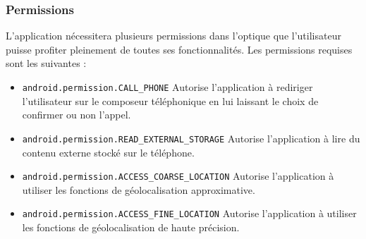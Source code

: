 \subsubsection{Permissions}

	L'application nécessitera plusieurs permissions dans l'optique que l'utilisateur puisse profiter pleinement de toutes ses fonctionnalités. Les permissions requises sont les suivantes : 
	\begin{itemize}
		\item \texttt{android.permission.CALL\_PHONE} Autorise l'application à rediriger l'utilisateur sur le composeur téléphonique en lui laissant le choix de confirmer ou non l'appel.
		\item \texttt{android.permission.READ\_EXTERNAL\_STORAGE} Autorise l'application à lire du contenu externe stocké sur le téléphone.
		\item \texttt{android.permission.ACCESS\_COARSE\_LOCATION} Autorise l'application à utiliser les fonctions de géolocalisation approximative.
		\item \texttt{android.permission.ACCESS\_FINE\_LOCATION} Autorise l'application à utiliser les fonctions de géolocalisation de haute précision.
	\end{itemize}	   	